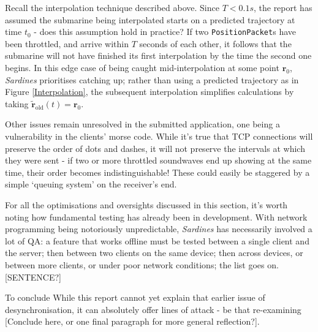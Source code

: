 \documentclass[a4paper, 9pt]{article}
\begin{document}
\begin{flushleft}
\vspace{5pt}\noindent
Recall the interpolation technique described above. Since $T < 0.1s$, the report has assumed the submarine being interpolated starts on a predicted trajectory at time $t_0$ - does this assumption hold in practice? If two \texttt{PositionPacket}s have been throttled, and arrive within $T$ seconds of each other, it follows that the submarine will not have finished its first interpolation by the time the second one begins. In this edge case of being caught mid-interpolation at some point $\mathbf{r}_0$, \textit{Sardines} prioritises catching up; rather than using a predicted trajectory as in Figure \ref{Interpolation}, the subsequent interpolation simplifies calculations by taking $\mathbf{\tilde{r}}_{\textrm{old}}(t) = \mathbf{r}_0$.

\vspace{5pt}\noindent
Other issues remain unresolved in the submitted application, one being a vulnerability in the clients' morse code. While it's true that TCP connections will preserve the order of dots and dashes, it will not preserve the intervals at which they were sent - if two or more throttled soundwaves end up showing at the same time, their order becomes indistinguishable! These could easily be staggered by a simple `queuing system' on the receiver's end.

\vspace{5pt}\noindent
For all the optimisations and oversights discussed in this section, it's worth noting how fundamental testing has already been in development. With network programming being notoriously unpredictable, \textit{Sardines} has necessarily involved a lot of QA: a feature that works offline must be tested between a single client and the server; then between two clients on the same device; then across devices, or between more clients, or under poor network conditions; the list goes on. [SENTENCE?]

\vspace{5pt}\noindent
To conclude
While this report cannot yet explain that earlier issue of desynchronisation, it can absolutely offer lines of attack - be that re-examining [Conclude here, or one final paragraph for more general reflection?]. 



\end{flushleft}
\end{document}
